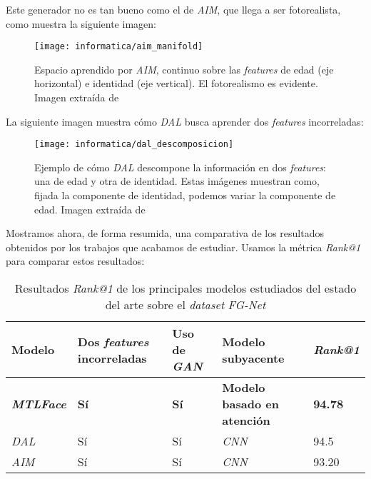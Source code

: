 Este generador no es tan bueno como el de \textit{AIM}, que llega a ser fotorealista, como muestra la siguiente imagen:

\begin{figure}[H]
    \centering
    \texttt{[image: informatica/aim\_manifold]}
    \caption{Espacio aprendido por \textit{AIM}, continuo sobre las \textit{features} de edad (eje horizontal) e identidad (eje vertical). El fotorealismo es evidente. Imagen extraída de \cite{informatica:aim}}
\end{figure}

La siguiente imagen muestra cómo \textit{DAL} busca aprender dos \textit{features} incorreladas:

\begin{figure}[H]
    \centering
    \texttt{[image: informatica/dal\_descomposicion]}
    \caption{Ejemplo de cómo \textit{DAL} descompone la información en dos \textit{features}: una de edad y otra de identidad. Estas imágenes muestran como, fijada la componente de identidad, podemos variar la componente de edad. Imagen extraída de \cite{informatica:dal}}
\end{figure}

Mostramos ahora, de forma resumida, una comparativa de los resultados obtenidos por los trabajos que acabamos de estudiar. Usamos la métrica \textit{Rank@1} \footnotemark para comparar estos resultados:

\begin{table}[H]
\centering
\begin{tabular}{|l|l|l|l|l|}
    \hline
    Modelo & Dos \textit{features} incorreladas & Uso de \textit{GAN} & Modelo subyacente & \textit{Rank@1} \\
    \hline

    \textbf{\textit{MTLFace}} & \textbf{Sí} & \textbf{Sí} & \textbf{Modelo basado en atención} & \textbf{94.78} \\
    \textit{DAL} & Sí & Sí & \textit{CNN} & 94.5 \\
    \textit{AIM} & Sí & Sí & \textit{CNN} & 93.20 \\
    \hline

\end{tabular}
\caption{Resultados \textit{Rank@1} de los principales modelos estudiados del estado del arte sobre el \textit{dataset} \textit{FG-Net}}
\end{table}


